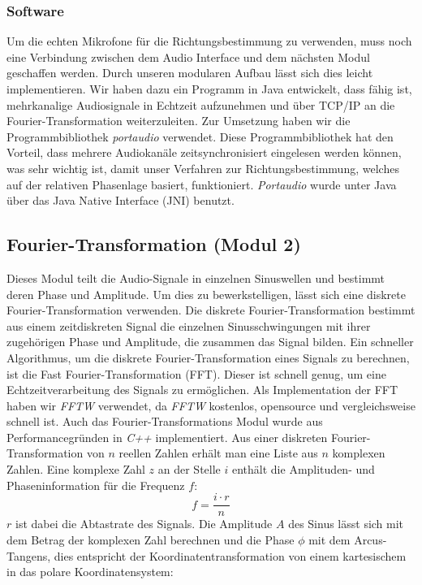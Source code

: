 \subsubsection{Software}
Um die echten Mikrofone für die Richtungsbestimmung zu verwenden, muss noch eine Verbindung zwischen dem Audio Interface und dem nächsten Modul geschaffen werden. Durch unseren modularen Aufbau lässt sich dies leicht implementieren. Wir haben dazu ein Programm in Java entwickelt, dass fähig ist, mehrkanalige Audiosignale in Echtzeit aufzunehmen und über TCP/IP an die Fourier-Transformation weiterzuleiten. Zur Umsetzung haben wir die Programmbibliothek \textit{portaudio} \cite{portaudio} verwendet. Diese Programmbibliothek hat den Vorteil, dass mehrere Audiokanäle zeitsynchronisiert eingelesen werden können, was sehr wichtig ist, damit unser Verfahren zur Richtungsbestimmung, welches auf der relativen Phasenlage basiert, funktioniert. \textit{Portaudio} wurde unter Java über das Java Native Interface (JNI) benutzt.

\subsection{Fourier-Transformation (Modul 2)}
Dieses Modul teilt die Audio-Signale in einzelnen Sinuswellen und bestimmt deren Phase und Amplitude. Um dies zu bewerkstelligen, lässt sich eine diskrete Fourier-Transformation verwenden. Die diskrete Fourier-Transformation bestimmt aus einem zeitdiskreten Signal die einzelnen Sinusschwingungen mit ihrer zugehörigen Phase und Amplitude, die zusammen das Signal bilden. Ein schneller Algorithmus, um die diskrete Fourier-Transformation eines Signals zu berechnen, ist die Fast Fourier-Transformation (FFT). Dieser ist schnell genug, um eine Echtzeitverarbeitung des Signals zu ermöglichen. Als Implementation der FFT haben wir \textit{FFTW}\cite{FFTW} verwendet, da \textit{FFTW} kostenlos, opensource und vergleichsweise schnell ist.
Auch das Fourier-Transformations Modul wurde aus Performancegründen in \textit{C++} implementiert.
Aus einer diskreten Fourier-Transformation von $n$ reellen Zahlen erhält man eine Liste aus $n$ komplexen Zahlen. Eine komplexe Zahl $z$ an der Stelle $i$ enthält die Amplituden- und Phaseninformation für die Frequenz $f$:
$$
f = \frac{i\cdot r}{n}
$$
$r$ ist dabei die Abtastrate des Signals. Die Amplitude $A$ des Sinus lässt sich mit dem Betrag der komplexen Zahl berechnen und die Phase $\phi$ mit dem Arcus-Tangens, dies entspricht der Koordinatentransformation von einem kartesischem in das polare Koordinatensystem:

